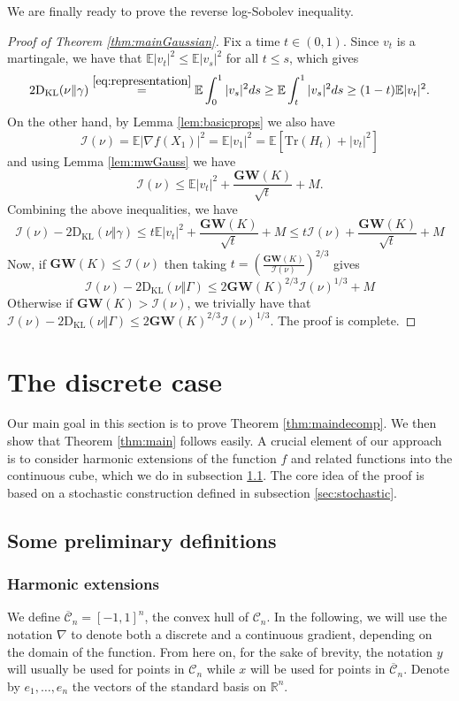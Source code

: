 \documentclass[12pt]{article}
\def \I{\mathcal{I}}
\def \RR {\mathbb R}
\def \EE {\mathbb E}
\def \CC {\mathbb C}
\def \tr {\mathrm{Tr}}
\def \DC {\mathcal{C}_n}
\def \CC {\overline{\mathcal{C}}_n}
\def \MW {\mathbf{GW}}
\def \KL {\mathrm{D}_{\mathrm{KL}}}
\theoremstyle{definition}
\theoremstyle{remark}
\begin{document}
We are finally ready to prove the reverse log-Sobolev inequality.
\begin{proof}[Proof of Theorem \ref{thm:mainGaussian}]
Fix a time $t \in (0,1)$. Since $v_t$ is a martingale, we have that $\EE |v_t|^2 \leq \EE |v_s|^2$ for all $t \leq s$, which gives
$$
2 \KL(\nu \Vert \gamma) \stackrel{\eqref{eq:representation}}{=} \EE \int_0^1 |v_s|^2 ds \geq  \EE \int_t^1 |v_s|^2 ds \geq (1-t) \EE |v_t|^2.
$$
On the other hand, by Lemma \ref{lem:basicprops} we also have
$$
\I(\nu) = \EE |\nabla f(X_1)|^2 = \EE |v_1|^2 = \EE \left [ \tr(H_t) + |v_t|^2 \right ]
$$
and using Lemma \ref{lem:mwGauss} we have
$$
\I(\nu) \leq \EE |v_t|^2 + \frac{\MW(K)}{ \sqrt{t}} + M.
$$
Combining the above inequalities, we have 
$$
\I(\nu) - 2 \KL(\nu \Vert \gamma) \leq t \EE |v_t|^2 + \frac{\MW(K)}{ \sqrt{t}} + M \leq t \I (\nu) + \frac{\MW(K)}{ \sqrt{t}} + M
$$
Now, if $\MW(K) \leq \I(\nu)$ then taking $t = \left (\frac{\MW(K)}{\I(\nu)}\right )^{2/3}$ gives
$$
\I(\nu) - 2 \KL(\nu \Vert \Gamma) \leq 2 \MW(K)^{2/3} \I(\nu)^{1/3} + M
$$
Otherwise if $\MW(K) > \I(\nu)$, we trivially have that $\I(\nu) - 2 \KL(\nu \Vert \Gamma) \leq 2 \MW(K)^{2/3} \I(\nu)^{1/3}$. The proof is complete.
\end{proof}

\section{The discrete case}
Our main goal in this section is to prove Theorem \ref{thm:maindecomp}. We then show that Theorem \ref{thm:main} follows easily. A crucial element of our approach is to consider harmonic extensions of the function $f$ and related functions into the continuous cube, which we do in subsection \ref{sec:preliminaries}. The core idea of the proof is based on a stochastic construction defined in subsection \ref{sec:stochastic}.

\subsection{Some preliminary definitions} \label{sec:preliminaries}
\subsubsection{Harmonic extensions}
We define $\CC = [-1,1]^n$, the convex hull of $\DC$. In the following, we will use the notation $\nabla$ to denote both a discrete and a continuous gradient, depending on the domain of the function. From here on, for the sake of brevity, the notation $y$ will usually be used for points in $\DC$ while $x$ will be used for points in $\CC$. Denote by $e_1,\dots,e_n$ the vectors of the standard basis on $\RR^n$.
\end{document}
